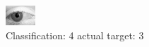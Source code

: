 \begin{figure}[h!]
\begin{center}
\includegraphics[width=0.60\columnwidth]{figures/ID2781_class_4_target_3.png}
\end{center}
\caption{ Classification: 4 actual target: 3}
\label{fig:ID2781_class_4_target_3}
\end{figure}
